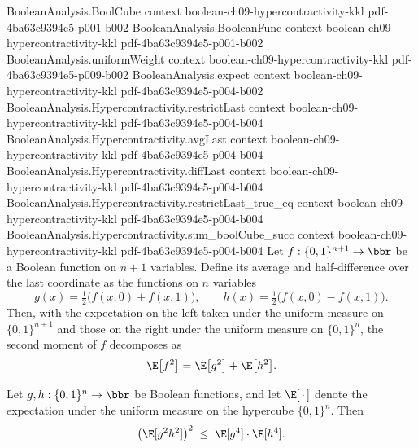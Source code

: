 \begin{lemma}
\leanok
{}
\label{BooleanAnalysis.Hypercontractivity.second_moment_decomp}
\proofstep
  {BooleanAnalysis.BoolCube}
  {context}
  {boolean-ch09-hypercontractivity-kkl}
  {pdf-4ba63c9394e5-p001-b002}
\proofstep
  {BooleanAnalysis.BooleanFunc}
  {context}
  {boolean-ch09-hypercontractivity-kkl}
  {pdf-4ba63c9394e5-p001-b002}
\proofstep
  {BooleanAnalysis.uniformWeight}
  {context}
  {boolean-ch09-hypercontractivity-kkl}
  {pdf-4ba63c9394e5-p009-b002}
\proofstep
  {BooleanAnalysis.expect}
  {context}
  {boolean-ch09-hypercontractivity-kkl}
  {pdf-4ba63c9394e5-p004-b002}
\proofstep
  {BooleanAnalysis.Hypercontractivity.restrictLast}
  {context}
  {boolean-ch09-hypercontractivity-kkl}
  {pdf-4ba63c9394e5-p004-b004}
\proofstep
  {BooleanAnalysis.Hypercontractivity.avgLast}
  {context}
  {boolean-ch09-hypercontractivity-kkl}
  {pdf-4ba63c9394e5-p004-b004}
\proofstep
  {BooleanAnalysis.Hypercontractivity.diffLast}
  {context}
  {boolean-ch09-hypercontractivity-kkl}
  {pdf-4ba63c9394e5-p004-b004}
\proofstep
  {BooleanAnalysis.Hypercontractivity.restrictLast_true_eq}
  {context}
  {boolean-ch09-hypercontractivity-kkl}
  {pdf-4ba63c9394e5-p004-b004}
\proofstep
  {BooleanAnalysis.Hypercontractivity.sum_boolCube_succ}
  {context}
  {boolean-ch09-hypercontractivity-kkl}
  {pdf-4ba63c9394e5-p004-b004}
Let $f : \{0,1\}^{n+1} \to \bbr$ be a Boolean function on $n+1$ variables. Define its
average and half-difference over the last coordinate as the functions on $n$ variables
\[
g(x) = \tfrac12\bigl(f(x,0) + f(x,1)\bigr), \qquad h(x) = \tfrac12\bigl(f(x,0) -
f(x,1)\bigr).
\]
Then, with the expectation on the left taken under the uniform measure on
$\{0,1\}^{n+1}$ and those on the right under the uniform measure on $\{0,1\}^n$, the
second moment of $f$ decomposes as
\[
  \E\bigl[f^2\bigr] = \E\bigl[g^2\bigr] + \E\bigl[h^2\bigr].
\]
\end{lemma}

\begin{lemma}
\leanok
{}
\label{BooleanAnalysis.Hypercontractivity.expect_cs_sq}
Let $g, h : \{0,1\}^n \to \bbr$ be Boolean functions, and let $\E[\,\cdot\,]$ denote the
expectation under the uniform measure on the hypercube $\{0,1\}^n$. Then
\[
  \bigl(\E[g^2 h^2]\bigr)^2 \;\le\; \E[g^4]\cdot\E[h^4].
\]
\end{lemma}

